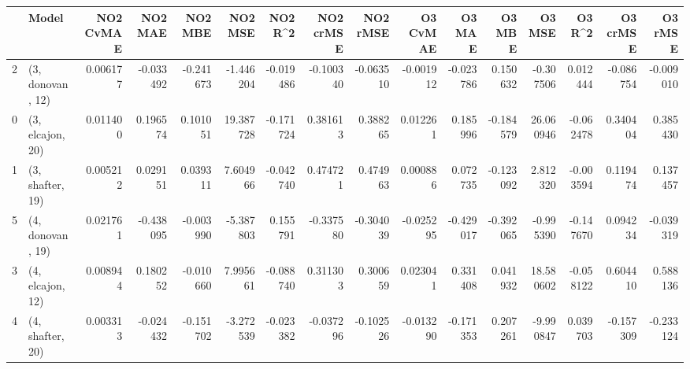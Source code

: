 \begin{tabular}{llrrrrrrrrrrrrrr}
\toprule
{} &             Model &  NO2 CvMAE &   NO2 MAE &   NO2 MBE &    NO2 MSE &   NO2 R\textasciicircum2 &  NO2 crMSE &  NO2 rMSE &  O3 CvMAE &    O3 MAE &    O3 MBE &     O3 MSE &    O3 R\textasciicircum2 &  O3 crMSE &   O3 rMSE \\
\midrule
2 &  (3, donovan, 12) &   0.006177 & -0.033492 & -0.241673 &  -1.446204 & -0.019486 &  -0.100340 & -0.063510 & -0.001912 & -0.023786 &  0.150632 &  -0.307506 &  0.012444 & -0.086754 & -0.009010 \\
0 &  (3, elcajon, 20) &   0.011400 &  0.196574 &  0.101051 &  19.387728 & -0.171724 &   0.381613 &  0.388265 &  0.012261 &  0.185996 & -0.184579 &  26.060946 & -0.062478 &  0.340404 &  0.385430 \\
1 &  (3, shafter, 19) &   0.005212 &  0.029151 &  0.039311 &   7.604966 & -0.042740 &   0.474721 &  0.474963 &  0.000886 &  0.072735 & -0.123092 &   2.812320 & -0.003594 &  0.119474 &  0.137457 \\
5 &  (4, donovan, 19) &   0.021761 & -0.438095 & -0.003990 &  -5.387803 &  0.155791 &  -0.337580 & -0.304039 & -0.025295 & -0.429017 & -0.392065 &  -0.995390 & -0.147670 &  0.094234 & -0.039319 \\
3 &  (4, elcajon, 12) &   0.008944 &  0.180252 & -0.010660 &   7.995661 & -0.088740 &   0.311303 &  0.300659 &  0.023041 &  0.331408 &  0.041932 &  18.580602 & -0.058122 &  0.604410 &  0.588136 \\
4 &  (4, shafter, 20) &   0.003313 & -0.024432 & -0.151702 &  -3.272539 & -0.023382 &  -0.037296 & -0.102526 & -0.013290 & -0.171353 &  0.207261 &  -9.990847 &  0.039703 & -0.157309 & -0.233124 \\
\bottomrule
\end{tabular}
